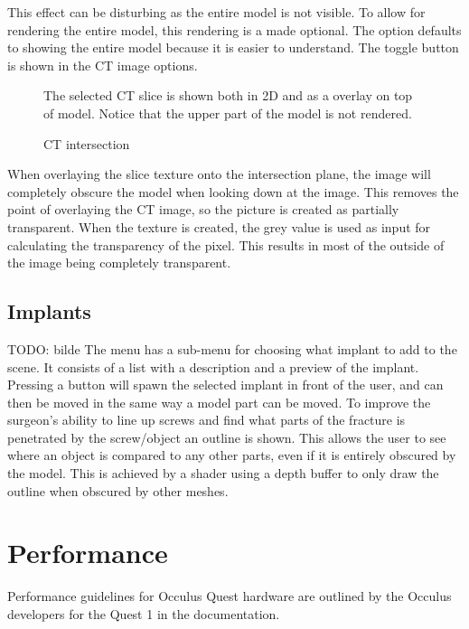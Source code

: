 \documentclass[a4paper]{report}
\begin{document}
This effect can be disturbing as the entire model is not visible. To allow for rendering the entire model, this rendering is a made optional. The option defaults to showing the entire model because it is easier to understand.
The toggle button is shown in the CT image options.

\begin{figure}[h!]
    \centering
	\hfill
  \caption{CT intersection}
  \small
  The selected CT slice is shown both in 2D and as a overlay on top of model. Notice that the upper part of the model is not rendered.
\end{figure}

When overlaying the slice texture onto the intersection plane, the image will completely obscure the model when looking down at the image. This removes the point of overlaying the CT image, so the picture is created as partially transparent. When the texture is created, the grey value is used as input for calculating the transparency of the pixel. This results in most of the outside of the image being completely transparent.

\subsection{Implants}
TODO: bilde
The menu has a sub-menu for choosing what implant to add to the scene. It consists of a list with a description and a preview of the implant. Pressing a button will spawn the selected implant in front of the user, and can then be moved in the same way a model part can be moved.
To improve the surgeon's ability to line up screws and find what parts of the fracture is penetrated by the screw/object an outline is shown. This allows the user to see where an object is compared to any other parts, even if it is entirely obscured by the model. This is achieved by a shader using a depth buffer to only draw the outline when obscured by other meshes\cite{technologies_unity_nodate-1}.

\section{Performance}
Performance guidelines for Occulus Quest hardware are outlined by the Occulus developers for the Quest 1 in the documentation\cite{noauthor_oculus_nodate}.
\end{document}
